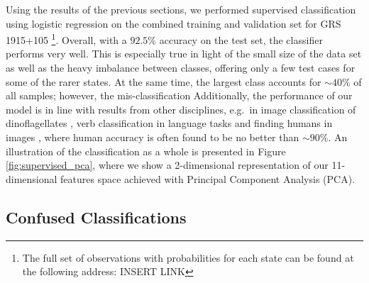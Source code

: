\documentclass[12pt]{emulateapj}
\begin{document}
Using the results of the previous sections, we performed supervised classification using logistic regression on the combined training and validation set for GRS 1915+105 \footnote{The full set of observations with probabilities for each state can be found at the following address: INSERT LINK}.
Overall, with a $92.5\%$ accuracy on the test set, the classifier performs very well. This is especially true in light of the small size of the data set as well
as the heavy imbalance between classes, offering only a few test cases for some of the rarer states. At the same time, the largest class accounts for $\sim 40\%$ of all samples; however, the mis-classification  Additionally, the performance of our model is in 
line with results from other disciplines, e.g.\ in image classification of dinoflagellates \citep{culverhouse2003}, verb classification in language tasks \citep{merlo2000} and finding humans in images \citep{quinn2010}, where human accuracy is often found to be no better than 
$\sim 90\%$. An illustration of the classification as a whole is presented in Figure \ref{fig:supervised_pca}, 
where we show a 2-dimensional representation of our 11-dimensional features space achieved with Principal Component Analysis (PCA). 

\subsection{Confused Classifications}
\label{sec:confusion}
\end{document}

